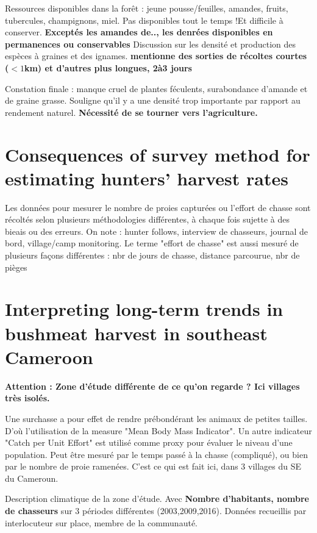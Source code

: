 \documentclass{article}
\begin{document}
Ressources disponibles dans la forêt : jeune pousse/feuilles, amandes, fruits, tubercules, champignons, miel. Pas disponibles tout le temps !Et difficile à conserver.
\textbf{Exceptés les amandes de.., les denrées disponibles en permanences ou conservables }
Discussion sur les densité et production des espèces à graines et des ignames.
\textbf{mentionne des sorties de récoltes courtes ($<1$km) et d'autres plus longues, 2à3 jours}

Constation finale : manque cruel de plantes féculents, surabondance d'amande et de graine grasse. Souligne qu'il y a une densité trop importante par rapport au rendement naturel. \textbf{Nécessité de se tourner vers l'agriculture.}



\section{Consequences of survey method for estimating hunters'
harvest rates}

Les données pour mesurer le nombre de proies capturées ou l'effort de chasse 
sont récoltés selon plusieurs méthodologies différentes, à chaque fois sujette à des bieais ou des erreurs. On note : hunter follows, interview de chasseurs, journal de bord, village/camp monitoring. Le terme "effort de chasse" est aussi mesuré de plusieurs façons différentes : nbr de jours de chasse, distance parcourue, nbr de pièges

\section{Interpreting long-term trends in bushmeat harvest in southeast Cameroon}
\textbf{Attention : Zone d'étude différente de ce qu'on regarde ? Ici villages très isolés.}


Une surchasse a pour effet de rendre prébondérant les animaux de petites tailles. D'où l'utilisation de la measure "Mean Body Mass Indicator". Un autre indicateur "Catch per Unit Effort" est utilisé comme proxy pour évaluer le niveau d'une population. Peut être mesuré par le temps passé à la chasse (compliqué), ou bien par le nombre de proie ramenées. C'est ce qui est fait ici, dans 3 villages du SE du Cameroun.


Description climatique de la zone d'étude. Avec \textbf{Nombre d'habitants, nombre de chasseurs} sur 3 périodes différentes (2003,2009,2016). Données recueillis par interlocuteur sur place, membre de la communauté.
\end{document}
